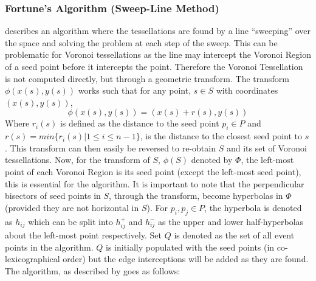 \subsubsection{Fortune's Algorithm (Sweep-Line Method)}\label{tes:ssec:fort}
\citet{fortune1987sweepline} describes an algorithm where the tessellations are found by a line ``sweeping'' over the space and solving the problem at each step of the sweep. This can be problematic for Voronoi tessellations as the line may intercept the Voronoi Region of a seed point before it intercepts the point. Therefore the Voronoi Tessellation is not computed directly, but through a geometric transform. The transform $\phi(x(s),y(s))$ works such that for any point, $s \in S$ with coordinates $(x(s),y(s))$, 
\begin{equation}
  \phi(x(s),y(s)) = (x(s) + r(s), y(s))
\end{equation}
Where $r_i(s)$ is defined as the distance to the seed point $p_i \in P$ and $r(s) = min\{r_i(s) | 1 \leq i \leq n-1\}$, is the distance to the closest seed point to $s$. This transform can then easily be reversed to re-obtain $S$ and its set of Voronoi tessellations. Now, for the transform of $S$, $\phi(S)$ denoted by $\Phi$, the left-most point of each Voronoi Region is its seed point (except the left-most seed point), this is essential for the algorithm. It is important to note that the perpendicular bisectors of seed points in $S$, through the transform, become hyperbolas in $\Phi$ (provided they are not horizontal in $S$). For $p_i,p_j\in P$, the hyperbola is denoted as $h_{ij}$ which can be split into $h^+_{ij}$ and $h^-_{ij}$ as the upper and lower half-hyperbolas about the left-most point respectively. Set $Q$ is denoted as the set of all event points in the algorithm. $Q$ is initially populated with the seed points (in co-lexicographical order) but the edge interceptions will be added as they are found. The algorithm, as described by \citet{okabe2009spatial} goes as follows:
